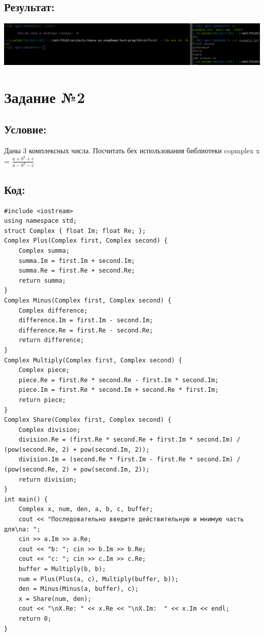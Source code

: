 \documentclass[a4paper]{article}
\begin{document}
\subsection{Результат:}
\includegraphics[width=1\textwidth]{1.png}
\newpage
\section{Задание №2} 
\subsection{Условие:}
Даны 3 комплексных числа. Посчитать бех использования библиотеки copmplex x = $\frac{a + b^3 + c}{a - b^2 - c}$
\subsection{Код:}
\scriptsize
\begin{verbatim}
#include <iostream>
using namespace std;
struct Complex { float Im; float Re; };
Complex Plus(Complex first, Complex second) {
    Complex summa;
    summa.Im = first.Im + second.Im;
    summa.Re = first.Re + second.Re;
    return summa;
}
Complex Minus(Complex first, Complex second) {
    Complex difference;
    difference.Im = first.Im - second.Im;
    difference.Re = first.Re - second.Re;
    return difference;
}
Complex Multiply(Complex first, Complex second) {
    Complex piece;
    piece.Re = first.Re * second.Re - first.Im * second.Im;
    piece.Im = first.Re * second.Im + second.Re * first.Im;
    return piece;
}
Complex Share(Complex first, Complex second) {
    Complex division;
    division.Re = (first.Re * second.Re + first.Im * second.Im) / (pow(second.Re, 2) + pow(second.Im, 2));
    division.Im = (second.Re * first.Im - first.Re * second.Im) / (pow(second.Re, 2) + pow(second.Im, 2));
    return division;
}
int main() {
    Complex x, num, den, a, b, c, buffer;
    cout << "Последовательно введите действительную и мнимую часть для\na: ";
    cin >> a.Im >> a.Re;
    cout << "b: "; cin >> b.Im >> b.Re;
    cout << "c: "; cin >> c.Im >> c.Re;
    buffer = Multiply(b, b);
    num = Plus(Plus(a, c), Multiply(buffer, b));
    den = Minus(Minus(a, buffer), c);
    x = Share(num, den);
    cout << "\nX.Re: " << x.Re << "\nX.Im:  " << x.Im << endl;
    return 0;
}\end{verbatim}\normalsize
\end{document}
